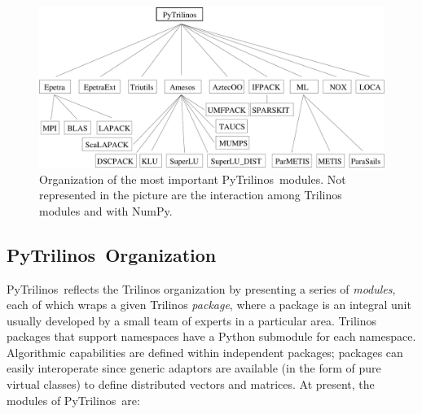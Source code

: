 \documentclass[acmtocl]{acmtrans2m}
\newcommand{\PyTrilinos}{{PyTrilinos}}
\begin{document}
\begin{figure}
  \begin{center}
    \includegraphics[width=12cm]{organization}
    \caption{Organization of the most important \PyTrilinos\ modules.
      Not represented in the picture are the interaction among
      Trilinos modules and with NumPy.}
    \label{fig:organization}
  \end{center}
\end{figure}

\subsection{\PyTrilinos\ Organization}
\label{sec:organization}

\PyTrilinos\ reflects the Trilinos organization by presenting a series
of {\sl modules}, each of which wraps a given Trilinos {\sl package},
where a package is an integral unit usually developed by a small team
of experts in a particular area.  Trilinos packages that support
namespaces have a Python submodule for each namespace.  Algorithmic
capabilities are defined within independent packages; packages can
easily interoperate since generic adaptors are available (in the form
of pure virtual classes) to define distributed vectors and matrices.
At present, the modules of \PyTrilinos\ are:
\end{document}
